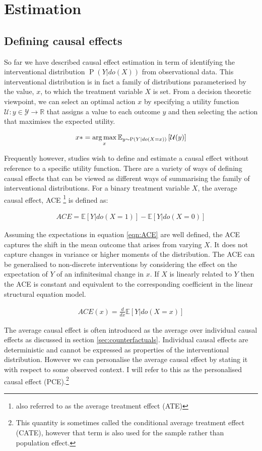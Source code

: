 \documentclass[11pt,a4paper,oneside]{book}
\newcommand{\Esub}[2]{\mathbb E_{#1}\left[{#2}\right]}
\newcommand{\E}[1]{\mathbb E\left[{#1}\right]}
\newcommand{\argmax}{\operatornamewithlimits{arg\,max}}
\newcommand{\eqn}[1]{\begin{align}#1\end{align}}
\renewcommand{\P}[1]{\operatorname{P}\left(#1\right)}
\theoremstyle{plain}
\theoremstyle{definition}
\begin{document}
\section{Estimation}
\subsection{Defining causal effects} 
So far we have described causal effect estimation in term of identifying the interventional distribution $\P{Y|do(X)}$ from observational data. This interventional distribution is in fact a family of distributions parameterised by the value, $x$, to which the treatment variable $X$ is set. From a decision theoretic viewpoint, we can select an optimal action $x$ by specifying a utility function $\mathcal{U}:y \in \mathcal{Y} \rightarrow \mathbb{R}$ that assigns a value to each outcome $y$ and then selecting the action that maximises the expected utility. 

\eqn{
\label{eqn:utility_max}
x* =\argmax_x \Esub{y\sim\P{Y|do(X=x)}}{{\cal{U}}(y)}
} 

Frequently however, studies wish to define and estimate a causal effect without reference to a specific utility function. There are a variety of ways of defining causal effects that can be viewed as different ways of summarising the family of interventional distributions. For a binary treatment variable $X$, the average causal effect, ACE \footnote{also referred to as the average treatment effect (ATE)} is defined as:

\eqn{
\label{eqn:ACE}
ACE = \E{Y|do(X = 1)} - \E{Y|do(X=0)}
}

Assuming the expectations in equation \ref{eqn:ACE} are well defined, the ACE captures the shift in the mean outcome that arises from varying $X$. It does not capture changes in variance or higher moments of the distribution. The ACE can be generalised to non-discrete interventions by considering the effect on the expectation of $Y$ of an infinitesimal change in $x$. If $X$ is linearly related to $Y$ then the ACE is constant and equivalent to the corresponding coefficient in the linear structural equation model. 

\eqn{
\label{eqn:ACE_continuous}
ACE(x) = \frac{d}{dx}\E{Y|do(X=x)}
}


The average causal effect is often introduced as the average over individual causal effects as discussed in section \ref{sec:counterfactuals}. Individual causal effects are deterministic and cannot be expressed as properties of the interventional distribution. However we can personalise the average causal effect by stating it with respect to some observed context. I will refer to this as the personalised causal effect (PCE).\footnote{This quantity is sometimes called the conditional average treatment effect (CATE), however that term is also used for the sample rather than population effect.} 
\end{document}
